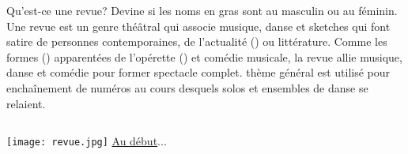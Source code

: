 \begin{frame}{Qu'est-ce une revue?}
  Devine si les noms \alert{en gras} sont au masculin ou au féminin.\\
  \vspace{0.5cm}
  Une revue est un genre théâtral qui associe musique, danse et sketches qui font \underline{} \alert{satire} de personnes contemporaines, de l'\alert{actualité} () ou \underline{} \alert{littérature}.
  Comme les \alert{formes} (\uncover<5->{f.}) apparentées de l'\alert{opérette} () et \underline{} \alert{comédie} musicale, la revue allie musique, danse et comédie pour former \underline{} \alert{spectacle} complet.
  \underline{} \alert{thème} général est utilisé pour \underline{} \alert{enchaînement} de numéros au cours desquels solos et ensembles de danse se relaient.
  
  \vspace{0.25cm}
  \begin{columns}
      \texttt{[image: revue.jpg]}
      \raggedleft
      \hyperlink{début}{Au début}...
  \end{columns}
\end{frame}